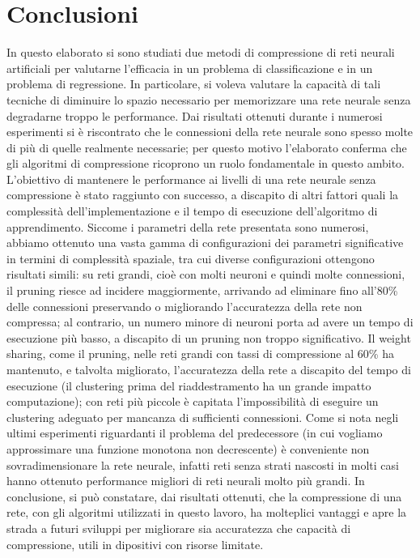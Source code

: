 \documentclass[11pt,a4paper,twoside,
openright]{book}
\begin{document}
	
	
	
\chapter*{Conclusioni}
In questo elaborato si sono studiati due metodi di compressione di reti neurali artificiali per valutarne l’efficacia in un problema di classificazione e in un problema di regressione. In particolare, si voleva valutare la capacità di tali tecniche di diminuire lo spazio necessario per memorizzare una rete neurale senza degradarne troppo le performance. 
Dai risultati ottenuti durante i numerosi esperimenti si è riscontrato che le connessioni della rete neurale sono spesso molte di più di quelle realmente necessarie; per questo motivo l’elaborato conferma che gli algoritmi di compressione ricoprono un ruolo fondamentale in questo ambito. L’obiettivo di mantenere le performance ai livelli di una rete neurale senza compressione è stato raggiunto con successo, a discapito di altri fattori  quali la complessità dell’implementazione e il tempo di esecuzione dell'algoritmo di apprendimento.
Siccome i parametri della rete presentata sono numerosi, abbiamo ottenuto una vasta gamma di configurazioni dei parametri significative in termini di complessità spaziale, tra cui diverse configurazioni ottengono risultati simili: su reti grandi, cioè con molti neuroni e quindi molte connessioni, il pruning riesce ad incidere maggiormente, arrivando ad eliminare fino all'80\% delle connessioni preservando o migliorando l'accuratezza della rete non compressa; al contrario, un numero minore di neuroni porta ad avere un tempo di esecuzione più basso, a discapito di un pruning non troppo significativo. 
Il weight sharing, come il pruning, nelle reti grandi con tassi di compressione al 60\% ha mantenuto, e talvolta migliorato, l'accuratezza della rete a discapito del tempo di esecuzione (il clustering prima del riaddestramento ha un grande impatto computazione); con reti più piccole è capitata l’impossibilità di eseguire un clustering adeguato per mancanza di sufficienti connessioni. Come si nota negli ultimi esperimenti riguardanti il problema del predecessore (in cui vogliamo approssimare una funzione monotona non decrescente) è conveniente non sovradimensionare la rete neurale, infatti reti senza strati nascosti in molti casi hanno ottenuto performance migliori di reti neurali molto più grandi. In conclusione, si può constatare, dai risultati ottenuti, che la compressione di una rete, con gli algoritmi utilizzati in questo lavoro, ha molteplici vantaggi e apre la strada a futuri sviluppi per migliorare sia accuratezza che capacità di compressione, utili in dipositivi con risorse limitate.
{}

\end{document}
